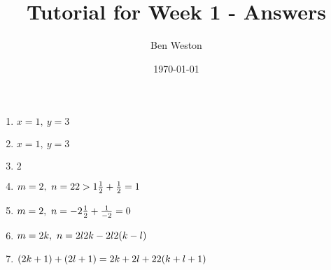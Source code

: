 \documentclass{article}
\title{Tutorial for Week 1 - Answers}
\author{Ben Weston}
\date{\today}
\begin{document}
\maketitle
\begin{enumerate}
	\item{$x=1,\ y=3$}
	\item{$x=1,\ y=3$}
	\item{$2$}
	\item{$m=2,\ n=2\\
		2>1\\
		\frac{1}{2}+\frac{1}{2}=1$}
	\item{$m=2,\ n=-2\\
		\frac{1}{2}+\frac{1}{-2}=0$}
	\item{$m=2k,\ n=2l\\
		2k-2l\\
		2(k-l)$}
	\item{$(2k+1)+(2l+1)=2k+2l+2\\
		2(k+l+1)$}
\end{enumerate}
\end{document}
